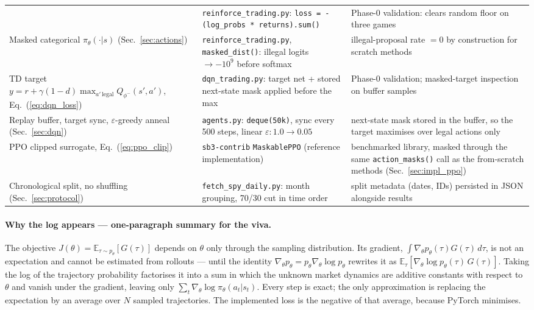 \begin{table}[h]
\begin{tabular}{p{4.6cm} p{4.9cm} p{4.3cm}}
 & \texttt{reinforce\_trading.py}:
   \texttt{loss = -(log\_probs * returns).sum()}
 & Phase-0 validation: clears random floor on three games \\
\addlinespace
Masked categorical $\pi_\theta(\cdot|s)$ (Sec.~\ref{sec:actions})
 & \texttt{reinforce\_trading.py}, \texttt{masked\_dist()}:
   illegal logits $\to -10^9$ before softmax
 & illegal-proposal rate $=0$ by construction for scratch methods \\
\addlinespace
TD target
 $y = r + \gamma(1{-}d)\max_{a'\,\mathrm{legal}} Q_{\phi^-}(s',a')$,
 Eq.~(\ref{eq:dqn_loss})
 & \texttt{dqn\_trading.py}: target net + stored next-state mask
   applied before the max
 & Phase-0 validation; masked-target inspection on buffer samples \\
\addlinespace
Replay buffer, target sync, $\varepsilon$-greedy anneal
 (Sec.~\ref{sec:dqn})
 & \texttt{agents.py}: \texttt{deque(50k)}, sync every 500
   steps, linear $\varepsilon\!: 1.0 \to 0.05$
 & next-state mask stored in the buffer, so the target maximises over
   legal actions only \\
\addlinespace
PPO clipped surrogate, Eq.~(\ref{eq:ppo_clip})
 & \texttt{sb3-contrib} \texttt{MaskablePPO} (reference implementation)
 & benchmarked library, masked through the same
   \texttt{action\_masks()} call as the from-scratch methods
   (Sec.~\ref{sec:impl_ppo}) \\
\addlinespace
Chronological split, no shuffling (Sec.~\ref{sec:protocol})
 & \texttt{fetch\_spy\_daily.py}: month grouping, 70/30 cut in time
   order
 & split metadata (dates, IDs) persisted in JSON alongside results \\
\bottomrule
\end{tabular}
\end{table}

\paragraph{Why the log appears --- one-paragraph summary for the viva.}
The objective $J(\theta) = \mathbb{E}_{\tau\sim p_\theta}[G(\tau)]$
depends on $\theta$ only through the sampling distribution. Its gradient,
$\int \nabla_\theta p_\theta(\tau) G(\tau)\,d\tau$, is not an expectation
and cannot be estimated from rollouts --- until the identity
$\nabla_\theta p_\theta = p_\theta \nabla_\theta \log p_\theta$ rewrites
it as
$\mathbb{E}_{\tau}[\nabla_\theta \log p_\theta(\tau)\, G(\tau)]$. Taking
the log of the trajectory probability factorises it into a sum in which
the unknown market dynamics are additive constants with respect to
$\theta$ and vanish under the gradient, leaving only
$\sum_t \nabla_\theta \log \pi_\theta(a_t|s_t)$. Every step is exact; the
only approximation is replacing the expectation by an average over $N$
sampled trajectories. The implemented loss is the negative of that
average, because PyTorch minimises.
